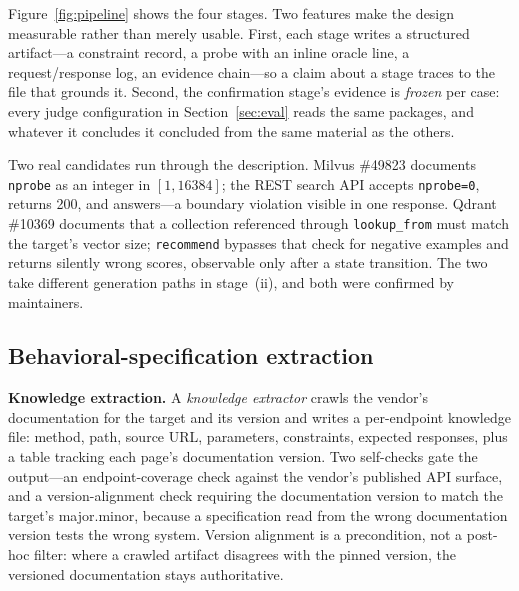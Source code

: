 \documentclass[acmsmall,screen,review,anonymous]{acmart}
\begin{document}
Figure~\ref{fig:pipeline} shows the four stages. Two features make the design measurable rather than
merely usable. First, each stage writes a structured artifact---a constraint record, a probe with an
inline oracle line, a request/response log, an evidence chain---so a claim about a stage traces to the
file that grounds it. Second, the confirmation stage's evidence is \emph{frozen} per case: every judge
configuration in Section~\ref{sec:eval} reads the same packages, and whatever it concludes it
concluded from the same material as the others.

Two real candidates run through the description. Milvus \#49823 documents \texttt{nprobe} as an
integer in $[1, 16384]$; the REST search API accepts \texttt{nprobe=0}, returns 200, and
answers---a boundary violation visible in one response. Qdrant \#10369 documents that a collection
referenced through \texttt{lookup\_from} must match the target's vector size; \texttt{recommend}
bypasses that check for negative examples and returns silently wrong scores, observable only after a
state transition. The two take different generation paths in stage~(ii), and both were confirmed by
maintainers.

\subsection{Behavioral-specification extraction}
\label{subsec:extraction}

\textbf{Knowledge extraction.} A \emph{knowledge extractor} crawls the vendor's documentation for
the target and its version and writes a per-endpoint knowledge file: method, path, source URL,
parameters, constraints, expected responses, plus a table tracking each page's documentation
version. Two self-checks gate the output---an endpoint-coverage check against the vendor's published
API surface, and a version-alignment check requiring the documentation version to match the
target's major.minor, because a specification read from the wrong documentation version tests the
wrong system. Version alignment is a precondition, not a post-hoc filter: where a crawled artifact
disagrees with the pinned version, the versioned documentation stays authoritative.
\end{document}

